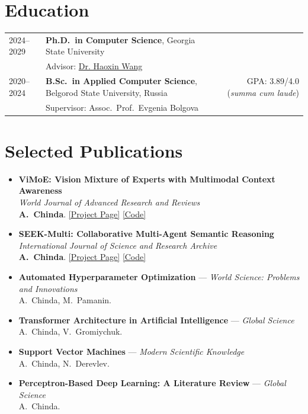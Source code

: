 \documentclass[a4paper,11pt]{article}
\begin{document}
\section*{Education}

\begin{tabularx}{\linewidth}{@{}l >{\raggedright\arraybackslash}X r@{}}
  2024--2029 & \textbf{Ph.D.\ in Computer Science}, Georgia State University & \\
             & Advisor: \href{https://www.amai-gsu.us/group/}{Dr. Haoxin Wang} & \\[5pt]
  2020--2024 & \textbf{B.Sc.\ in Applied Computer Science}, Belgorod State University, Russia & GPA: 3.89/4.0 (\textit{summa cum laude}) \\
             & Supervisor: Assoc.\ Prof.\ Evgenia Bolgova &
\end{tabularx}

\section*{Selected Publications}

\begin{itemize}[leftmargin=1em,itemsep=5pt]
  \item \textbf{ViMoE: Vision Mixture of Experts with Multimodal Context Awareness} \\
        \textit{World Journal of Advanced Research and Reviews} \\
        \textbf{A.\ Chinda}.
        \enspace \href{https://arrdel.github.io/vimoe/}{[Project Page]}
        \enspace \href{https://github.com/arrdel/vimoe}{[Code]}

  \item \textbf{SEEK-Multi: Collaborative Multi-Agent Semantic Reasoning} \\
        \textit{International Journal of Science and Research Archive} \\
        \textbf{A.\ Chinda}.
        \enspace \href{https://arrdel.github.io/seek-multi/}{[Project Page]}
        \enspace \href{https://github.com/arrdel/seek-multi}{[Code]}

  \item \textbf{Automated Hyperparameter Optimization} --- \textit{World Science: Problems and Innovations} \\
        A.\ Chinda, M.\ Pamanin.

  \item \textbf{Transformer Architecture in Artificial Intelligence} --- \textit{Global Science} \\
        A.\ Chinda, V.\ Gromiychuk.

  \item \textbf{Support Vector Machines} --- \textit{Modern Scientific Knowledge} \\
        A.\ Chinda, N.\ Derevlev.

  \item \textbf{Perceptron-Based Deep Learning: A Literature Review} --- \textit{Global Science} \\
        A.\ Chinda.
\end{itemize}
\end{document}
